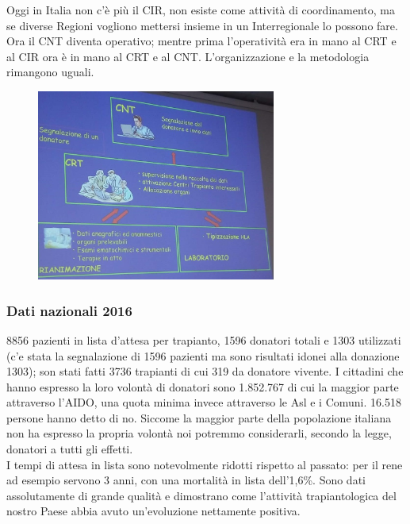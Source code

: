 Oggi in Italia non c'è più il CIR, non esiste come attività di
coordinamento, ma se diverse Regioni vogliono mettersi insieme in un
Interregionale lo possono fare. Ora il CNT diventa operativo; mentre
prima l'operatività era in mano al CRT e al CIR ora è in mano al CRT e
al CNT. L'organizzazione e la metodologia rimangono uguali.

\begin{figure}[!ht]
\centering
	\includegraphics[width=0.7\textwidth]{34/image6.jpeg}
	\end{figure}

\subsubsection{Dati nazionali 2016}


8856 pazienti in lista d'attesa per trapianto, 1596 donatori totali e
1303 utilizzati (c'e stata la segnalazione di 1596 pazienti ma sono
risultati idonei alla donazione 1303); son stati fatti 3736 trapianti di
cui 319 da donatore vivente. I cittadini che hanno espresso la loro
volontà di donatori sono 1.852.767 di cui la maggior parte attraverso
l'AIDO, una quota minima invece attraverso le Asl e i Comuni. 16.518
persone hanno detto di no. Siccome la maggior parte della popolazione
italiana non ha espresso la propria volontà noi potremmo considerarli,
secondo la legge, donatori a tutti gli effetti.
\\
I tempi di attesa in lista sono notevolmente ridotti rispetto al
passato: per il rene ad esempio servono 3 anni, con una mortalità in
lista dell'1,6\%. Sono dati assolutamente di grande qualità e dimostrano
come l'attività trapiantologica del nostro Paese abbia avuto
un'evoluzione nettamente positiva.

